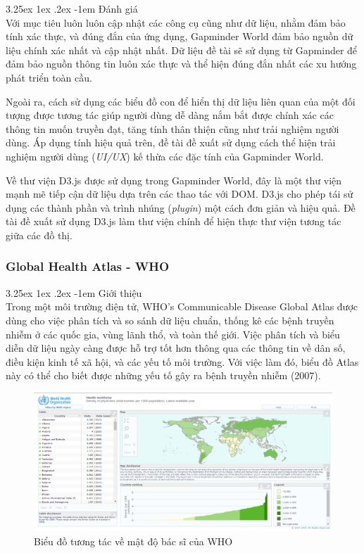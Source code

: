 \documentclass[12pt,a4paper]{article}
\makeatletter
\newcommand{\myparagraph}[1]{\paragraph{#1}\mbox{}\\} %
\renewcommand\paragraph{\@startsection{paragraph}{5}{\z@}%
  {3.25ex \@plus1ex \@minus.2ex}%
  {-1em}%
  {\normalfont\normalsize\bfseries}}
\makeatother
\begin{document}
\myparagraph{Đánh giá}
Với mục tiêu luôn luôn cập nhật các công cụ cũng như dữ liệu, nhằm đảm bảo tính xác thực, và đúng đắn của ứng dụng, Gapminder World đảm bảo nguồn dữ liệu chính xác nhất và cập nhật nhất.
Dữ liệu đề tài sẽ sử dụng từ Gapminder để đảm bảo nguồn thông tin luôn xác thực và thể hiện đúng đắn nhất các xu hướng phát triển toàn cầu.

Ngoài ra, cách sử dụng các biểu đồ con để hiển thị dữ liệu liên quan của một đối tượng được tương tác giúp người dùng dễ dàng nắm bắt được chính xác các thông tin muốn truyền đạt, tăng tính thân thiện cũng như trải nghiệm người dùng. Áp dụng tính hiệu quả trên, đề tài đề xuất sử dụng cách thể hiện trải nghiệm người dùng (\textit{UI/UX}) kế thừa các đặc tính của Gapminder World. 

Về thư viện D3.js được sử dụng trong Gapminder World, đây là một thư viện mạnh mẽ tiếp cận dữ liệu dựa trên các thao tác với DOM. D3.js cho phép tái sử dụng các thành phần và trình nhúng (\textit{plugin}) một cách đơn giản và hiệu quả. Đề tài đề xuất sử dụng D3.js làm thư viện chính để hiện thực thư viện tương tác giữa các đồ thị.
\subsubsection{Global Health Atlas - WHO}
\myparagraph{Giới thiệu}
Trong một môi trường điện tử, WHO’s Communicable Disease Global Atlas được dùng cho việc phân tích và so sánh dữ liệu chuẩn, thống kê các bệnh truyền nhiễm ở các quốc gia, vùng lãnh thổ, và toàn thế giới. Việc phân tích và biểu diễn dữ liệu ngày càng được hỗ trợ tốt hơn thông qua các thông tin về dân số, điều kiện kinh tế xã hội, và các yếu tố môi trường. Với việc làm đó, biểu đồ Atlas này có thể cho biết được những yếu tố gây ra bệnh truyền nhiễm (2007)\cite{gha}.
\begin{figure}[!h]
    \begin{center}
    \includegraphics[scale=.4]{image/globalatlas}
    \caption{Biểu đồ tương tác về mật độ bác sĩ của WHO}
    \label{fig:globalatlas}
    \end{center}
\end{figure}
\end{document}
